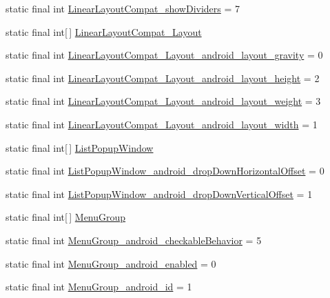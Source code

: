\begin{DoxyCompactItemize}
\item 
static final int \hyperlink{classcheck_1_1test_1_1_r_1_1styleable_a71cd3612e1f50bfb49a67c1415778854}{Linear\+Layout\+Compat\+\_\+show\+Dividers} = 7
\item 
static final int\mbox{[}$\,$\mbox{]} \hyperlink{classcheck_1_1test_1_1_r_1_1styleable_a06b8cec0701fce506df2a245c8c71b9d}{Linear\+Layout\+Compat\+\_\+\+Layout}
\item 
static final int \hyperlink{classcheck_1_1test_1_1_r_1_1styleable_aa48e9aa39976dff71ce334a57bdf2be0}{Linear\+Layout\+Compat\+\_\+\+Layout\+\_\+android\+\_\+layout\+\_\+gravity} = 0
\item 
static final int \hyperlink{classcheck_1_1test_1_1_r_1_1styleable_a806ac33c9f85fe7dd05e4f470f07c354}{Linear\+Layout\+Compat\+\_\+\+Layout\+\_\+android\+\_\+layout\+\_\+height} = 2
\item 
static final int \hyperlink{classcheck_1_1test_1_1_r_1_1styleable_a299ea2d69f5676bd2a0f96a6d99a9be2}{Linear\+Layout\+Compat\+\_\+\+Layout\+\_\+android\+\_\+layout\+\_\+weight} = 3
\item 
static final int \hyperlink{classcheck_1_1test_1_1_r_1_1styleable_a66569db7d0c170d5da67560afcc12a87}{Linear\+Layout\+Compat\+\_\+\+Layout\+\_\+android\+\_\+layout\+\_\+width} = 1
\item 
static final int\mbox{[}$\,$\mbox{]} \hyperlink{classcheck_1_1test_1_1_r_1_1styleable_a1d50d8182170e4c2bdda14aea31bd244}{List\+Popup\+Window}
\item 
static final int \hyperlink{classcheck_1_1test_1_1_r_1_1styleable_a4565a14e8b210c2b611dbd00fdbefbd4}{List\+Popup\+Window\+\_\+android\+\_\+drop\+Down\+Horizontal\+Offset} = 0
\item 
static final int \hyperlink{classcheck_1_1test_1_1_r_1_1styleable_acecd6539df16569ba9082b78ed8d0e60}{List\+Popup\+Window\+\_\+android\+\_\+drop\+Down\+Vertical\+Offset} = 1
\item 
static final int\mbox{[}$\,$\mbox{]} \hyperlink{classcheck_1_1test_1_1_r_1_1styleable_a95a67e0fb4cd8754aea3728538c936cf}{Menu\+Group}
\item 
static final int \hyperlink{classcheck_1_1test_1_1_r_1_1styleable_ad0fe31daacd1ba191fff33b4f294c242}{Menu\+Group\+\_\+android\+\_\+checkable\+Behavior} = 5
\item 
static final int \hyperlink{classcheck_1_1test_1_1_r_1_1styleable_a4181140c18864b52c09f5f001c0f9cba}{Menu\+Group\+\_\+android\+\_\+enabled} = 0
\item 
static final int \hyperlink{classcheck_1_1test_1_1_r_1_1styleable_a46daffdbc2d6252d224472748228ac3c}{Menu\+Group\+\_\+android\+\_\+id} = 1

\end{DoxyCompactItemize}
